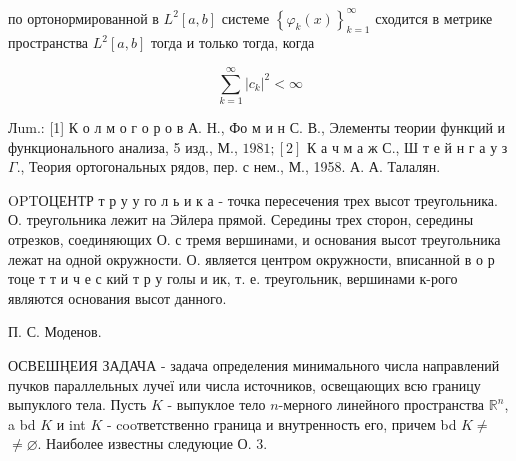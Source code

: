 \documentclass[10pt]{article}
\begin{document}
по ортонормированной в $L^{2}[a, b]$ системе $\left\{\varphi_{k}(x)\right\}_{k=1}^{\infty}$ сходится в метрике пространства $L^{2}[a, b]$ тогда и только тогда, когда

\[
\sum_{k=1}^{\infty}\left|c_{k}\right|^{2}<\infty
\]

Лum.: [1] К о л м о г о р о в А. Н., Фо м и н С. В., Элементы теории функций и функционального анализа, 5 изд., М., $1981 ;[2]$ К а ч м а ж С., Ш т е й н г а у з $\Gamma$., Теория ортогональных рядов, пер. с нем., М., 1958. А. А. Талалян.

OPTОЦЕНТР т р у у го л ь и к а - точка пересечения трех высот треугольника. О. треугольника лежит на Эйлера прямой. Середины трех сторон, середины отрезков, соединяющих О. с тремя вершинами, и основания высот треугольника лежат на одной окружности. О. является центром окружности, вписанной в о р тоце т т и ч е с кий т р у голы и ик, т. е. треугольник, вершинами к-рого являются основания высот данного.

П. С. Моденов.

ОСВЕШҢЕИЯ ЗАДАЧА - задача определения минимального числа направлений пучков параллельных лучеї или числа источников, освещающих всю границу выпуклого тела. Пусть $K$ - выпуклое тело $n$-мерного линейного пространства $\mathbb{R}^{n}$, a bd $K$ и int $K$ - cooтветственно граница и внутренность его, причем bd $K \neq$ $\neq \varnothing$. Наиболее известны следуюцие О. 3.
\end{document}

